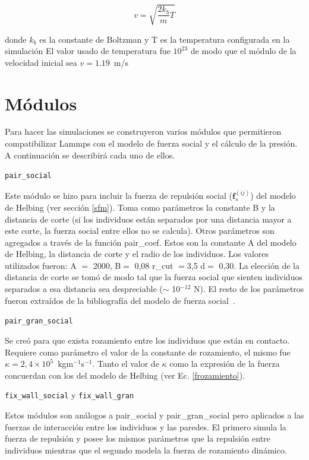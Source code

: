 \begin{equation}
v=\sqrt{\frac{2k_b}{m}T}
\end{equation}

donde $k_b$ es la constante de Boltzman y T es la temperatura configurada en la simulación
El valor usado de temperatura fue $10^{23}$ de modo que el módulo de la velocidad inicial sea $v=1.19$~m/s




\section{\label{modulos}Módulos}

Para hacer las simulaciones se construyeron varios módulos que permitieron compatibilizar Lammps con el modelo de fuerza social y el cálculo de la presión. A continuación se describirá cada uno de ellos. 

{\Large {\tt pair\_social}}

Este módulo se hizo para incluir la fuerza de repulsión social ($\mathbf{f}_s^{(ij)}$) del modelo de Helbing (ver sección \ref{sfm}). Toma como parámetros la constante B y la distancia de corte (si los individuos están separados por una distancia mayor a este corte, la fuerza social entre ellos no se calcula).
Otros parámetros son agregados a través de la función pair\_coef. Estos son la constante A del modelo de Helbing, la distancia 
de corte y el radio de los individuos. Los valores utilizados fueron: A $=$ 2000, B$=$ 0,08 r\_cut $=$3,5 d$=$ 0,30.
La elección de la distancia de corte se tomó de modo tal que la fuerza social que sienten individuos separados a esa distancia
sea despreciable ($\sim$ 10$^{-12}$ N). El resto de los parámetros fueron extraídos de la bibliografía del modelo de fuerza social~\cite{Helbing1}.

{\Large {\tt pair\_gran\_social}}

Se creó para que exista rozamiento entre los individuos que están en contacto. Requiere como parámetro el valor de la constante de rozamiento, el mismo fue $\kappa =2,4 \times 10^5$~kgm$^{-1}$s$^{-1}$. Tanto el valor de $\kappa$ como la expresión de la fuerza concuerdan con los del modelo de Helbing (ver Ec. \ref{frozamiento}).

{\Large {\tt fix\_wall\_social} y {\tt fix\_wall\_gran}}

Estos módulos son análogos a pair\_social y pair\_gran\_social pero aplicados a las fuerzas de interacción entre los individuos y las paredes. El primero simula la fuerza de repulsión y posee los mismos parámetros que la repulsión entre individuos mientras que el segundo modela la fuerza de rozamiento dinámico. 


